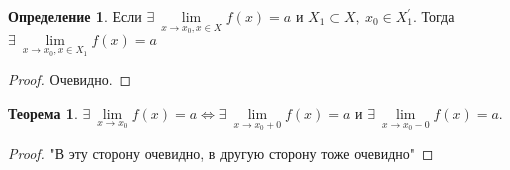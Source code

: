 \documentclass[a4paper, 12pt]{article}
\theoremstyle{definition}
\newtheorem*{definition}{Определение}
\newtheorem*{theorem}{Теорема}
\begin{document}
        \begin{definition}
            Если $\exists\ \lim\limits_{x\to x_0,x\in X}f(x)=a$ и $X_1\subset X,\ x_0\in X_1^{\prime}$. Тогда\\
            $\exists\ \lim\limits_{x\to x_0,x\in X_1}f(x)=a$
        \end{definition} 
        \begin{proof}
            Очевидно.
        \end{proof}
        \begin{theorem}
            $\exists\ \lim\limits_{x\to x_0}f(x)=a \Leftrightarrow \exists\ \lim\limits_{x\to x_0+0}f(x)=a$ и $\exists\ \lim\limits_{x\to x_0-0}f(x)=a$.
        \end{theorem} 
        \begin{proof}
            "В эту сторону очевидно, в другую сторону тоже очевидно"
        \end{proof} 
\end{document}
